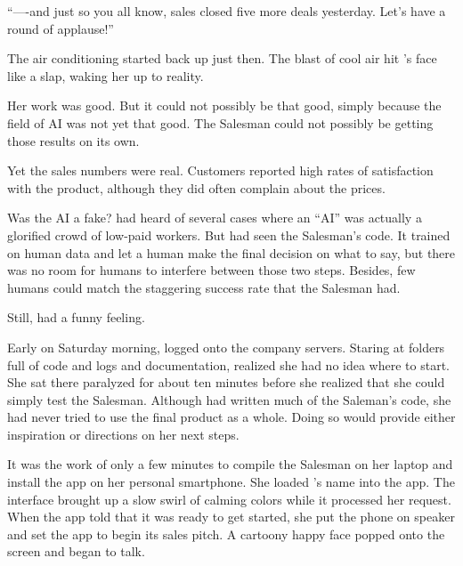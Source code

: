 ``----and just so you all know, sales closed five more deals yesterday. Let's have a round of applause!''

The air conditioning started back up just then. The blast of cool air hit {\protag}'s face like a slap, waking her up to reality.

Her work was good. But it could not possibly be that good, simply because the field of AI was not yet that good. The Salesman could not possibly be getting those results on its own.

Yet the sales numbers were real. Customers reported high rates of satisfaction with the product, although they did often complain about the prices.


Was the AI a fake? {\protag} had heard of several cases where an ``AI'' was actually a glorified crowd of low-paid workers. But {\protag} had seen the Salesman's code. It trained on human data and let a human make the final decision on what to say, but there was no room for humans to interfere between those two steps. Besides, few humans could match the staggering success rate that the Salesman had.

Still, {\protag} had a funny feeling.



Early on Saturday morning, {\protag} logged onto the company servers. Staring at folders full of code and logs and documentation, {\protag} realized she had no idea where to start.  She sat there paralyzed for about ten minutes before she realized that she could simply test the Salesman. Although {\protag} had written much of the Saleman's code, she had never tried to use the final product as a whole. Doing so would provide either inspiration or directions on her next steps.

It was the work of only a few minutes to compile the Salesman on her laptop and install the app on her personal smartphone. She loaded {\sidetag}'s name into the app. The interface brought up a slow swirl of calming colors while it processed her request. When the app told {\protag} that it was ready to get started, she put the phone on speaker and set the app to begin its sales pitch. A cartoony happy face popped onto the screen and began to talk.

